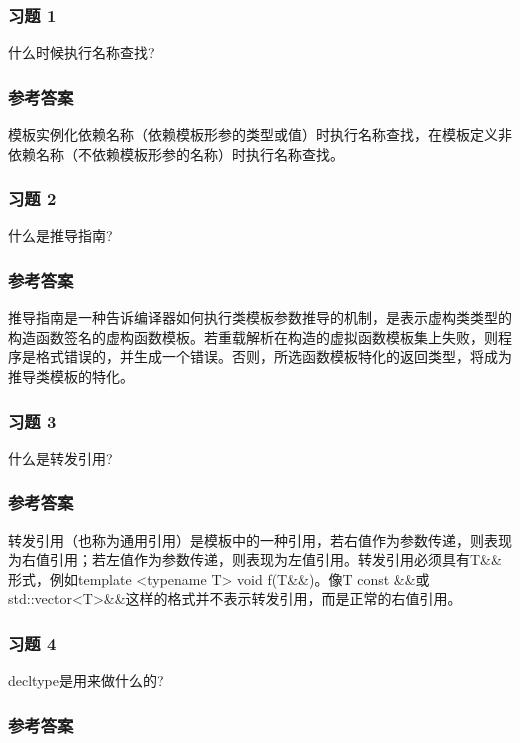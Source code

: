 \subsubsection{习题 1}

什么时候执行名称查找?

\subsubsection{参考答案}

模板实例化依赖名称（依赖模板形参的类型或值）时执行名称查找，在模板定义非依赖名称（不依赖模板形参的名称）时执行名称查找。


\subsubsection{习题 2}

什么是推导指南?

\subsubsection{参考答案}

推导指南是一种告诉编译器如何执行类模板参数推导的机制，是表示虚构类类型的构造函数签名的虚构函数模板。若重载解析在构造的虚拟函数模板集上失败，则程序是格式错误的，并生成一个错误。否则，所选函数模板特化的返回类型，将成为推导类模板的特化。

\subsubsection{习题 3}

什么是转发引用?

\subsubsection{参考答案}

转发引用（也称为通用引用）是模板中的一种引用，若右值作为参数传递，则表现为右值引用；若左值作为参数传递，则表现为左值引用。转发引用必须具有T\&\&形式，例如template <typename T> void f(T\&\&)。像T const \&\&或std::vector<T>\&\&这样的格式并不表示转发引用，而是正常的右值引用。

\subsubsection{习题 4}

decltype是用来做什么的?

\subsubsection{参考答案}

